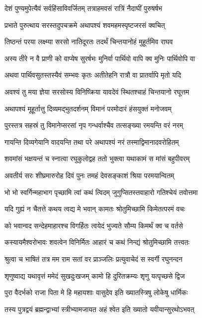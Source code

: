 \twolineshloka
{देशं पुण्यमुपेत्यैवं सर्वहिंसाविवर्जितम्}
{तत्राहमवसं रात्रिं नैदाघीं पुरुषर्षभ}%

\twolineshloka
{प्रभाते पुरुत्थाय सरस्तदुपचक्रमे}
{अथापश्यं शवमहमस्पृष्टजरसं क्वचित्}%

\twolineshloka
{तिष्ठन्तं परया लक्ष्म्या सरसो नातिदूरतः}
{तदर्थं चिन्तयानोहं मुहूर्तमिव राघव}%

\twolineshloka
{अस्य तीरे न वै प्राणी को वाप्येष सुरर्षभः}
{मुनिर्वा पार्थिवो वापि क्व मुनिः पार्थिवोपि वा}%

\twolineshloka
{अथवा पार्थिवसुतस्तस्यैवं सम्भवः कृतः}
{अतीतेहनि रात्रौ वा प्रातर्वापि मृतो यदि}%

\twolineshloka
{अवश्यं तु मया ज्ञेया सरसोस्य विनिष्क्रिया}
{यावदेवं स्थितश्चाहं चिन्तयानो रघूत्तम}%

\twolineshloka
{अथापश्यं मूहूर्तात्तु दिव्यमद्भुतदर्शनम्}
{विमानं परमोदारं हंसयुक्तं मनोजवम्}%

\twolineshloka
{पुरस्तत्र सहस्रं तु विमानेप्सरसां नृप}
{गन्धर्वाश्चैव तत्सङ्ख्या रमयन्ति वरं नरम्}%

\twolineshloka
{गायन्ति दिव्यगेयानि वादयन्ति तथा परे}
{अथापश्यं नरं तस्माद्विमानादवरोहितम्}%

\twolineshloka
{शवमांसं भक्षयन्तं च स्नात्वा रघुकुलोद्वह}
{ततो भुक्त्वा यथाकामं स मांसं बहुपीवरम्}%

\twolineshloka
{अवतीर्य सरः शीघ्रमारुरोह दिवं पुनः}
{तमहं देवसङ्काशं श्रिया परमयान्वितम्}%

\twolineshloka
{भो भो स्वर्गिन्महाभाग पृच्छामि त्वां कथं त्विदम्}
{जुगुप्सितस्तवाहारो गतिश्चेयं तवोत्तमा}%

\twolineshloka
{यदि गुह्यं न चैतत्ते कथय त्वद्य मे भवान्}
{कामतः श्रोतुमिच्छामि किमेतत्परमं वचः}%

\twolineshloka
{को भवान्वद सन्देहमाहारश्च विगर्हितः}
{त्वयेदं भुज्यते सौम्य किमर्थं क्व च वर्तसे}%

\twolineshloka
{कस्यायमैश्वरोभावः शवत्वेन विनिर्मितः}
{आहारं च कथं निन्द्यं श्रोतुमिच्छामि तत्त्वतः}%

\twolineshloka
{श्रुत्वा च भाषितं तत्र मम राम सतां वर}
{प्राञ्जलिः प्रत्युवाचेदं स स्वर्गी रघुनन्दन}%

\twolineshloka
{शृणुष्वाद्य यथावृत्तं ममेदं सुखदुःखजम्}
{कामो हि दुरितक्रम्यः शृणु यत्पृच्छसे द्विज}%

\twolineshloka
{पुरा वैदर्भको राजा पिता मे हि महायशाः}
{वासुदेव इति ख्यातस्त्रिषु लोकेषु धार्मिकः}%

\twolineshloka
{तस्य पुत्रद्वयं ब्रह्मन्द्वाभ्यां स्त्रीभ्यामजायत}
{अहं श्वेत इति ख्यातो यवीयान्सुरथोऽभवत्}%

